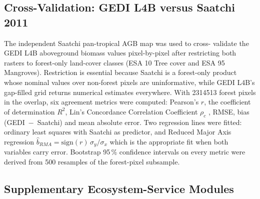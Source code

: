 \documentclass[12pt,a4paper]{article}
\begin{document}
\subsection{Cross-Validation: GEDI L4B versus Saatchi 2011}
\label{sec:methods-cv}

The independent Saatchi pan-tropical AGB map was used to cross-
validate the GEDI L4B aboveground biomass values pixel-by-pixel after
restricting both rasters to forest-only land-cover classes
(ESA 10 Tree cover and ESA 95 Mangroves). Restriction is essential
because Saatchi is a forest-only product whose nominal values over
non-forest pixels are uninformative, while GEDI L4B's gap-filled grid
returns numerical estimates everywhere. With \num{2314513} forest
pixels in the overlap, six agreement metrics were computed: Pearson's
$r$, the coefficient of determination $R^2$, Lin's Concordance
Correlation Coefficient $\rho_c$ \citep{lin1989}, RMSE, bias
(GEDI~$-$~Saatchi) and mean absolute error. Two regression lines were
fitted: ordinary least squares with Saatchi as predictor, and Reduced
Major Axis regression $\hat{b}_{RMA} = \mathrm{sign}(r)\,\sigma_y/
\sigma_x$ \citep{warton2006} which is the appropriate fit when both
variables carry error. Bootstrap 95\,\% confidence intervals on every
metric were derived from 500 resamples of the forest-pixel subsample.

\subsection{Supplementary Ecosystem-Service Modules}
\label{sec:methods-supp}
\end{document}
